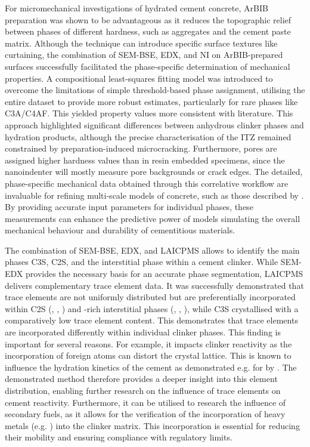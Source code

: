 For micromechanical investigations of hydrated cement concrete, \ac{ArBIB} preparation was shown to be advantageous as it reduces the topographic relief between phases of different hardness, such as aggregates and the cement paste matrix.
Although the technique can introduce specific surface textures like curtaining, the combination of \ac{SEM}-\ac{BSE}, \ac{EDX}, and \ac{NI} on \ac{ArBIB}-prepared surfaces successfully facilitated the phase-specific determination of mechanical properties.
A compositional least-squares fitting model was introduced to overcome the limitations of simple threshold-based phase assignment, utilising the entire dataset to provide more robust estimates, particularly for rare phases like \acs{C3A}/\acs{C4AF}. This yielded property values more consistent with literature.
This approach highlighted significant differences between anhydrous clinker phases and hydration products, although the precise characterisation of the \ac{ITZ} remained constrained by preparation-induced microcracking.
Furthermore, pores are assigned higher hardness values than in resin embedded specimens, since the nanoindenter will mostly measure pore backgrounds or crack edges.
The detailed, phase-specific mechanical data obtained through this correlative workflow are invaluable for refining multi-scale models of concrete, such as those described by \textcite{shittu.2026}.
By providing accurate input parameters for individual phases, these measurements can enhance the predictive power of models simulating the overall mechanical behaviour and durability of cementitious materials.

The combination of \ac{SEM}-\ac{BSE}, \ac{EDX}, and \ac{LAICPMS} allows to identify the main phases \ac{C3S}, \ac{C2S}, and the interstitial phase within a cement clinker.
While \ac{SEM}-\ac{EDX} provides the necessary basis for an accurate phase segmentation, \ac{LAICPMS} delivers complementary trace element data.
It was successfully demonstrated that trace elements are not uniformly distributed but are preferentially incorporated within \ac{C2S} (, , ) and -rich interstitial phases (, , ), while \ac{C3S} crystallised with a comparatively low trace element content.
This demonstrates that trace elements are incorporated differently within individual clinker phases.
This finding is important for several reasons.
For example, it impacts clinker reactivity as the incorporation of foreign atoms can distort the crystal lattice.
This is known to influence the hydration kinetics of the cement as demonstrated e.g. for  by \cite{galluccio.2020}.
The demonstrated method therefore provides a deeper insight into this element distribution, enabling further research on the influence of trace elements on cement reactivity. 
Furthermore, it can be utilised to research the influence of secondary fuels, as it allows for the verification of the incorporation of heavy metals (e.g. ) into the clinker matrix. This incorporation is essential for reducing their mobility and ensuring compliance with regulatory limits.

